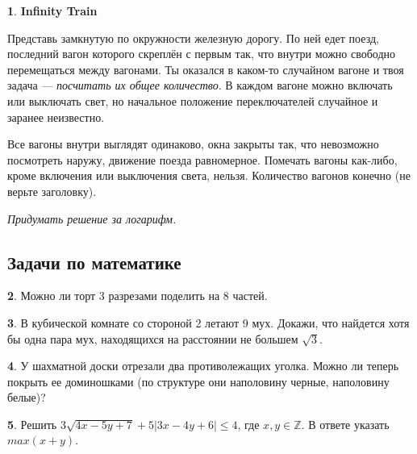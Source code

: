 \documentclass[14pt, a4paper]{extarticle}
\theoremstyle{definition}
\newtheorem{problem}{}
\theoremstyle{definition}
\theoremstyle{remark}
\numberwithin{equation}{section}
\newcommand{\Z}{\ensuremath{\mathbb{Z}}}
\begin{document}
\begin{problem}
    \textbf{Infinity Train}

    Представь замкнутую по окружности железную дорогу. 
    По ней едет поезд, последний вагон которого скреплён с первым так, 
    что внутри можно свободно перемещаться между вагонами. 
    Ты оказался в каком-то случайном вагоне и твоя задача — \textit{посчитать 
    их общее количество}. В каждом вагоне можно включать или выключать 
    свет, но начальное положение переключателей случайное и заранее неизвестно.

    Все вагоны внутри выглядят одинаково, окна закрыты так, что невозможно 
    посмотреть наружу, движение поезда равномерное. Помечать вагоны как-либо, 
    кроме включения или выключения света, нельзя. 
    Количество вагонов конечно (не верьте заголовку).

    \textit{Придумать решение за логарифм.}
\end{problem}

\subsection*{Задачи по математике}
\setcounter{problem}{0}

\begin{problem}
    Можно ли торт 3 разрезами поделить на 8 частей.
\end{problem}

\begin{problem}
    В кубической комнате со стороной 2 летают 9 мух. 
    Докажи, что найдется хотя бы одна пара мух, 
    находящихся на расстоянии не большем $\sqrt{3}$.
\end{problem}

\begin{problem}
    У шахматной доски отрезали два противолежащих уголка.
    Можно ли теперь покрыть ее доминошками (по структуре они
    наполовину черные, наполовину белые)?
\end{problem}

\begin{problem}
    Решить $3\sqrt{4x - 5y + 7} +
    5|3x - 4y + 6| \leqslant 4$, где $x, y \in \Z$.
    В ответе указать $max(x+y)$.
\end{problem}
\end{document}
